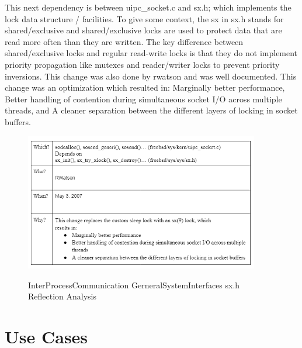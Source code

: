 \documentclass[12pt, dvipsnames, a4paper]{article}
\begin{document}
This next dependency is between uipc\_socket.c and sx.h; which implements the lock data structure / facilities. To give some context, the sx in sx.h stands for shared/exclusive and shared/exclusive locks are used to protect data that are read more often than they are written. The key difference between shared/exclusive locks and regular read-write locks is that they do not implement priority propagation like mutexes and reader/writer locks to prevent priority inversions. This change was also done by rwatson and was well documented. This change was an optimization which resulted in: Marginally better performance, Better handling of contention during simultaneous socket I/O across multiple threads, and A cleaner separation between the different layers of locking in socket buffers.

\begin{figure}[hbt!]
	\centering
	\includegraphics[width=290pt]{assets/IPC_Sx.png}
	\caption{InterProcessCommunication \-\> GerneralSystemInterfaces sx.h Reflection Analysis}\cite{sx}
\end{figure}

\clearpage
\section{Use Cases}
\end{document}
